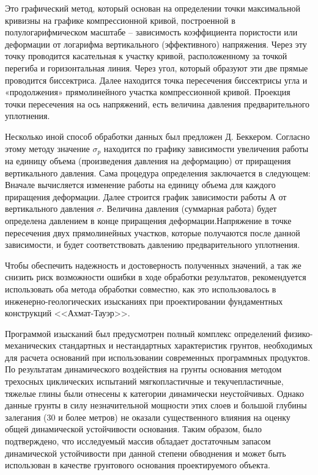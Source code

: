  
  Это графический метод, который основан на определении точки максимальной кривизны на графике компрессионной кривой, построенной в полулогарифмическом масштабе – зависимость коэффициента пористости или деформации от логарифма вертикального (эффективного) напряжения. Через эту точку проводится касательная к участку кривой, расположенному за точкой перегиба и горизонтальная линия. Через угол, который образуют эти две прямые проводится биссектриса. Далее находится точка пересечения биссектрисы угла и «продолжения» прямолинейного участка компрессионной кривой. Проекция точки пересечения на ось напряжений, есть величина давления предварительного уплотнения. 
  
  Несколько иной способ обработки данных был предложен Д. Беккером. Согласно этому методу значение $\sigma_p$ находится по графику зависимости увеличения работы на единицу объема (произведения давления на деформацию) от приращения вертикального давления. Сама процедура определения заключается в следующем: Вначале вычисляется изменение работы на единицу объема для каждого приращения деформации. Далее строится график зависимости работы А от вертикального давления $\sigma$. Величина давления (суммарная работа)  будет определена давлением в конце приращения деформации.Напряжение в точке пересечения двух прямолинейных участков, которые получаются после данной зависимости, и будет соответствовать давлению предварительного уплотнения.
  
  Чтобы обеспечить надежность и достоверность полученных значений, а так же снизить риск возможности ошибки в ходе обработки результатов, рекомендуется использовать оба метода обработки совместно, как это использовалось в инженерно-геологических изысканиях при проектировании фундаментных конструкций <<Ахмат-Тауэр>>. 

  Программой изысканий был предусмотрен полный комплекс определений физико-механических стандартных и нестандартных характеристик грунтов, необходимых для расчета оснований при использовании современных программных продуктов. По результатам динамического воздействия на грунты основания методом трехосных циклических испытаний мягкопластичные и текучепластичные, тяжелые глины были отнесены к категории динамически неустойчивых. Однако данные грунты в силу незначительной мощности этих слоев и большой глубины залегания (30 и более метров) не оказали существенного влияния на оценку общей динамической устойчивости основания. Таким образом, было подтверждено, что исследуемый массив обладает достаточным запасом динамической устойчивости при данной степени обводнения и может быть использован в качестве грунтового основания проектируемого объекта.

